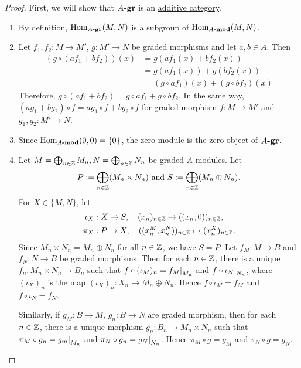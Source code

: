 \begin{proof}
    First, we will show that $A\textrm{\textup{\textbf{-gr}}}$ is an \hyperref[def:addCat]{additive category}.
    \begin{enumerate}[label=(\roman*)]
        \item By definition, $\operatorname{Hom}_{A\textrm{\textup{\textbf{-gr}}}}(M,N)$ is a subgroup of $\operatorname{Hom}_{A\textrm{\textup{\textbf{-mod}}}}(M,N)$.

        \item Let $f_1, f_2: M \rightarrow M'$, $g: M' \rightarrow N$ be graded morphisms and let $a, b \in A$.
        Then
        \begin{align*}
            (g \circ (af_1 + bf_2)) (x) &= g(af_1(x) + bf_2(x)) \\
            &= g(af_1(x)) + g(bf_2(x)) \\
            &= (g \circ af_1)(x) + (g \circ bf_2)(x)
        \end{align*}
        Therefore, $g \circ (af_1 + bf_2) = g \circ af_1 + g \circ bf_2$.
        In the same way, $ (ag_1 + bg_2) \circ f = ag_1 \circ f + bg_2 \circ f$ for graded morphism $f: M \rightarrow M'$ and $g_1,g_2: M' \rightarrow N$.

        \item Since $\operatorname{Hom}_{A\textrm{\textup{\textbf{-mod}}}}(0,0) = \{0\}$, the zero module is the zero object of $A\textrm{\textup{\textbf{-gr}}}$.
    
        \item Let $M = \bigoplus_{n\in{\mathbb Z}} M_n, N = \bigoplus_{n\in{\mathbb Z}} N_n$ be graded $A$-modules.
        Let $$ P := \bigoplus_{n\in{\mathbb Z}} (M_n \times N_n) \text{ and } S := \bigoplus_{n\in{\mathbb Z}} (M_n \oplus N_n). $$
        For $X \in \{M,N\}$, let
        \begin{align*}
            \iota_X&: X \rightarrow S, \quad (x_n)_{n\in{\mathbb Z}} \mapsto ((x_n,0))_{n\in{\mathbb Z}}, \\
            \pi_X&: P \rightarrow X, \quad ((x^M_n, x^N_n))_{n\in{\mathbb Z}} \mapsto (x^X_n)_{n\in{\mathbb Z}}.
        \end{align*}
        Since $M_n \times N_n = M_n \oplus N_n$ for all $n\in{\mathbb Z}$, we have $S=P$.
        Let $f_M: M \rightarrow B$ and $f_N: N \rightarrow B$ be graded morphisms.
        Then for each $n\in{\mathbb Z}$, there is a unique $f_n: M_n \times N_n \rightarrow B_n$ such that $f \circ (\iota_M)_n = \restr{f_M}{M_n}$ and $f \circ \restr{\iota_N}{N_n}$, where $(\iota_X)_n$ is the map $(\iota_X)_n: X_n \rightarrow M_n \oplus N_n$.
        Hence $f \circ \iota_M = f_M$ and $f \circ \iota_N = f_N$.

        Similarly, if $g_M: B \rightarrow M$, $g_n: B \rightarrow N$ are graded morphism, then for each $n\in{\mathbb Z}$, there is a unique morphism $g_n: B_n \rightarrow M_n \times N_n$ such that $\pi_M \circ g_n = \restr{g_m}{M_n}$ and $\pi_N \circ g_n = \restr{g_N}{N_n}$.
        Hence $\pi_M \circ g = g_M$ and $\pi_N \circ g = g_N$.
\end{enumerate}


\end{proof}
